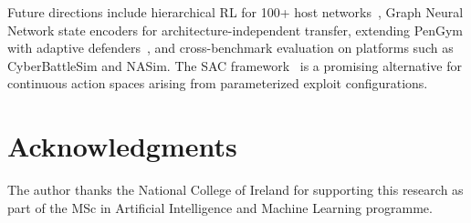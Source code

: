 \documentclass[conference]{IEEEtran}
\begin{document}
Future directions include hierarchical RL for 100+ host
networks~\cite{ghanem2023jiis}, Graph Neural Network state encoders for
architecture-independent transfer, extending PenGym with adaptive
defenders~\cite{tambe2011gametheory}, and cross-benchmark evaluation
on platforms such as CyberBattleSim and NASim.  The SAC framework~\cite{haarnoja2018sac}
is a promising alternative for continuous action spaces arising from
parameterized exploit configurations.

\section*{Acknowledgments}
The author thanks the National College of Ireland for supporting this
research as part of the MSc in Artificial Intelligence and Machine
Learning programme.



\end{document}
